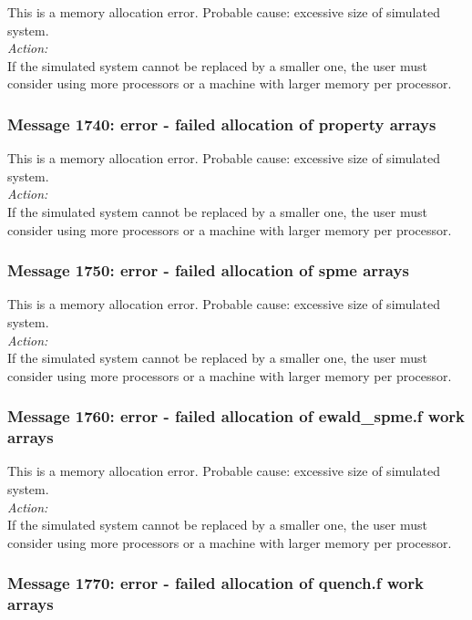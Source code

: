 This is a memory allocation error. Probable cause: excessive size of
simulated system. \\

\noindent
{\em Action:}\\
If the simulated system cannot be replaced by a smaller one, the user
must consider using more processors or a machine with larger memory
per processor.

\subsubsection*{Message 1740: error - failed allocation of property
arrays}

This is a memory allocation error. Probable cause: excessive size of
simulated system. \\

\noindent
{\em Action:}\\
If the simulated system cannot be replaced by a smaller one, the user
must consider using more processors or a machine with larger memory
per processor.

\subsubsection*{Message 1750: error - failed allocation of spme arrays}

This is a memory allocation error. Probable cause: excessive size of
simulated system. \\

\noindent
{\em Action:}\\
If the simulated system cannot be replaced by a smaller one, the user
must consider using more processors or a machine with larger memory
per processor.

\subsubsection*{Message 1760: error - failed allocation of ewald\_spme.f
work arrays}

This is a memory allocation error. Probable cause: excessive size of
simulated system. \\

\noindent
{\em Action:}\\
If the simulated system cannot be replaced by a smaller one, the user
must consider using more processors or a machine with larger memory
per processor.

\subsubsection*{Message 1770: error - failed allocation of quench.f
work arrays}

